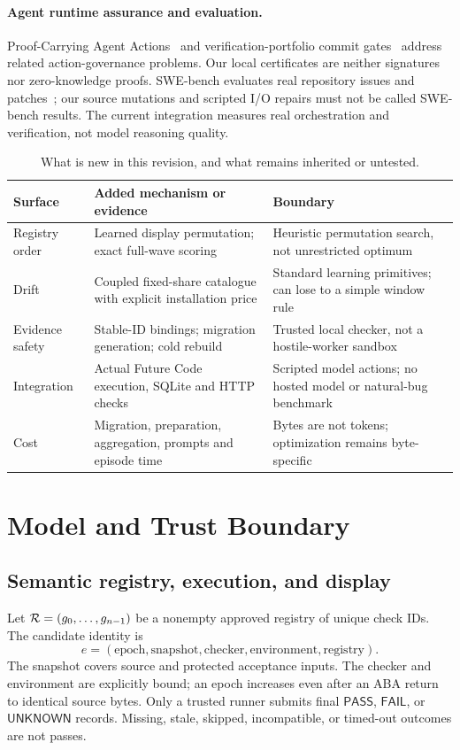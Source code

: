 \documentclass[11pt]{article}
\theoremstyle{definition}\newtheorem{definition}[theorem]{Definition}
\newcommand{\PASS}{\mathsf{PASS}}\newcommand{\FAIL}{\mathsf{FAIL}}\newcommand{\UNKNOWN}{\mathsf{UNKNOWN}}
\begin{document}
\paragraph{Agent runtime assurance and evaluation.}
Proof-Carrying Agent Actions~\cite{pcaa} and verification-portfolio commit gates~\cite{vpcontrol} address related action-governance problems. Our local certificates are neither signatures nor zero-knowledge proofs. SWE-bench evaluates real repository issues and patches~\cite{swebench}; our source mutations and scripted I/O repairs must not be called SWE-bench results. The current integration measures real orchestration and verification, not model reasoning quality.

\begin{table}[t]\centering\small
\caption{What is new in this revision, and what remains inherited or untested.}
\begin{tabularx}{\linewidth}{@{}p{.22\linewidth}XX@{}}\toprule
Surface & Added mechanism or evidence & Boundary\\\midrule
Registry order & Learned display permutation; exact full-wave scoring & Heuristic permutation search, not unrestricted optimum\\
Drift & Coupled fixed-share catalogue with explicit installation price & Standard learning primitives; can lose to a simple window rule\\
Evidence safety & Stable-ID bindings; migration generation; cold rebuild & Trusted local checker, not a hostile-worker sandbox\\
Integration & Actual Future Code execution, SQLite and HTTP checks & Scripted model actions; no hosted model or natural-bug benchmark\\
Cost & Migration, preparation, aggregation, prompts and episode time & Bytes are not tokens; optimization remains byte-specific\\\bottomrule
\end{tabularx}
\end{table}

\section{Model and Trust Boundary}\label{sec:model}
\subsection{Semantic registry, execution, and display}
Let $\mathcal R=(g_0,\ldots,g_{n-1})$ be a nonempty approved registry of unique check IDs. The candidate identity is
\[
 e=(\mathrm{epoch},\mathrm{snapshot},\mathrm{checker},\mathrm{environment},\mathrm{registry}).
\]
The snapshot covers source and protected acceptance inputs. The checker and environment are explicitly bound; an epoch increases even after an ABA return to identical source bytes. Only a trusted runner submits final $\PASS$, $\FAIL$, or $\UNKNOWN$ records. Missing, stale, skipped, incompatible, or timed-out outcomes are not passes.
\end{document}
